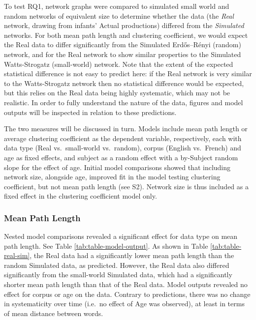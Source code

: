 \documentclass[
  man]{apa6}
\begin{document}
To test RQ1, network graphs were compared to simulated small world and random networks of equivalent size to determine whether the data (the \emph{Real} network, drawing from infants' Actual productions) differed from the \emph{Simulated} networks. For both mean path length and clustering coefficient, we would expect the Real data to differ significantly from the Simulated Erdős--Rényi (random) network, and for the Real network to show similar properties to the Simulated Watts-Strogatz (small-world) network. Note that the extent of the expected statistical difference is not easy to predict here: if the Real network is very similar to the Watts-Strogatz network then no statistical difference would be expected, but this relies on the Real data being highly systematic, which may not be realistic. In order to fully understand the nature of the data, figures and model outputs will be inspected in relation to these predictions.

The two measures will be discussed in turn. Models include mean path length or average clustering coefficient as the dependent variable, respectively, each with data type (Real vs.~small-world vs.~random), corpus (English vs.~French) and age as fixed effects, and subject as a random effect with a by-Subject random slope for the effect of age. Initial model comparisons showed that including network size, alongside age, improved fit in the model testing clustering coefficient, but not mean path length (see S2). Network size is thus included as a fixed effect in the clustering coefficient model only.

\hypertarget{mean-path-length}{%
\subsubsection{Mean Path Length}\label{mean-path-length}}

Nested model comparisons revealed a significant effect for data type on mean path length. See Table \ref{tab:table-model-output}. As shown in Table \ref{tab:table-real-sim}, the Real data had a significantly lower mean path length than the random Simulated data, as predicted. However, the Real data also differed significantly from the small-world Simulated data, which had a significantly shorter mean path length than that of the Real data. Model outputs revealed no effect for corpus or age on the data. Contrary to predictions, there was no change in systematicity over time (i.e.~no effect of Age was observed), at least in terms of mean distance between words.
\end{document}
